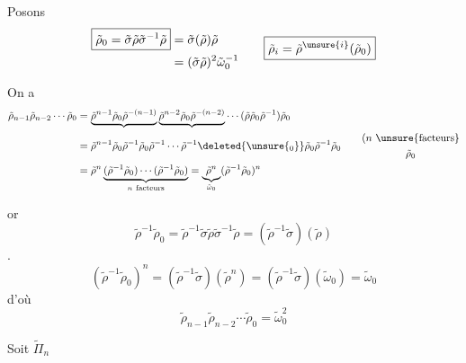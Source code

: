 Posons
\[
\begin{aligned}
\boxed{\tilde\rho_0=\tilde\sigma\tilde\rho\tilde\sigma^{-1}\tilde\rho}
&=\tilde\sigma(\tilde\rho)\tilde\rho\\
&=(\tilde\sigma\tilde\rho)^2\tilde\omega_0^{-1}
\end{aligned}
\qquad
\boxed{\tilde\rho_i=\tilde\rho^{\unsure{i}}(\tilde\rho_0)}
\]

On a
\[
\begin{aligned}
\tilde\rho_{n-1}\tilde\rho_{n-2}\cdots\tilde\rho_0
&=\underbrace{\tilde\rho^{n-1}\tilde\rho_0\tilde\rho^{-(n-1)}}
\underbrace{\tilde\rho^{n-2}\tilde\rho_0\tilde\rho^{-(n-2)}}
\cdots(\tilde\rho\tilde\rho_0\tilde\rho^{-1})\tilde\rho_0\\
&=\tilde\rho^{n-1}\tilde\rho_0\tilde\rho^{-1}\tilde\rho_0\tilde\rho^{-1}
\cdots\tilde\rho^{-1}\deleted{\unsure{{}_0}}\tilde\rho_0\tilde\rho^{-1}\tilde\rho_0
\qquad\begin{gathered}(n\ \text{\unsure{facteurs}}\\\tilde\rho_0\end{gathered}\\
&=\tilde\rho^n\underbrace{(\tilde\rho^{-1}\tilde\rho_0)\cdots(\tilde\rho^{-1}\tilde\rho_0)}_{n\ \text{facteurs}}
=\underbrace{\tilde\rho^n}_{\tilde\omega_0}(\tilde\rho^{-1}\tilde\rho_0)^n
\end{aligned}
\]

or
\[
\tilde\rho^{-1}\tilde\rho_0
=\tilde\rho^{-1}\tilde\sigma\tilde\rho\tilde\sigma^{-1}\tilde\rho
=(\tilde\rho^{-1}\tilde\sigma)(\tilde\rho)
\]
. 
\[
(\tilde\rho^{-1}\tilde\rho_0)^n
=(\tilde\rho^{-1}\tilde\sigma)(\tilde\rho^n)
=(\tilde\rho^{-1}\tilde\sigma)(\tilde\omega_0)
=\tilde\omega_0
\]
d'où
\[
\boxed{\tilde\rho_{n-1}\tilde\rho_{n-2}\cdots\tilde\rho_0=\tilde\omega_0^2}
\]

Soit $\widetilde\Pi_n$


